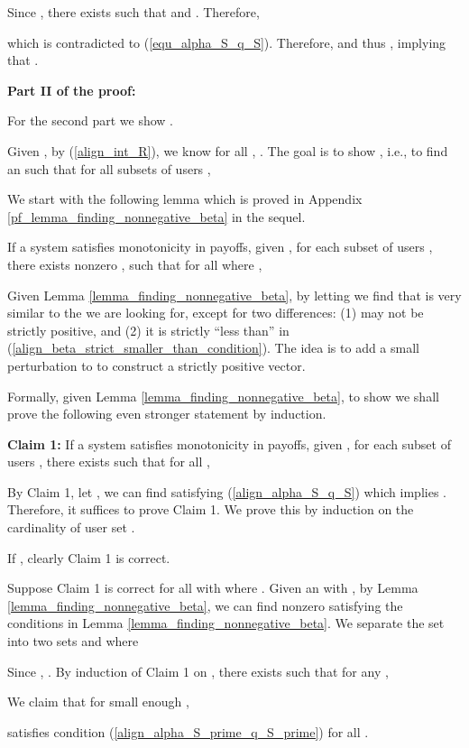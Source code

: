 \documentclass[prodmode,acmtompecs]{acmsmall}
\newcommand{\modelSatisfyPriorityImplication}{a system satisfies monotonicity in payoffs}
\begin{document}
Since , there exists  such that  and . Therefore, 

which is contradicted to (\ref{equ_alpha_S_q_S}). Therefore,  and thus , implying that . 

{\bf Part II of the proof: }

For the second part we show .

Given , by (\ref{align_int_R}), we know for all , . The goal is to show , i.e., to find an  such that for all subsets of users , 


We start with the following lemma which is proved in Appendix \ref{pf_lemma_finding_nonnegative_beta} in the sequel. 

\begin{lemma}
\label{lemma_finding_nonnegative_beta}
If \modelSatisfyPriorityImplication, given , for each subset of users , there exists nonzero , such that for all  where ,  

\end{lemma}

Given Lemma \ref{lemma_finding_nonnegative_beta}, by letting  we find  that is very similar to the  we are looking for, except for two differences: (1)  may not be strictly positive, and (2) it is strictly ``less than'' in (\ref{align_beta_strict_smaller_than_condition}). 
The idea is to add a small perturbation to  to construct a strictly positive vector. 

Formally, given Lemma \ref{lemma_finding_nonnegative_beta}, to show  we shall prove the following even stronger statement by induction. 

{\bf Claim 1:} If \modelSatisfyPriorityImplication, given , for each subset of users , there exists  such that for all , 


By Claim 1, let , we can find  satisfying (\ref{align_alpha_S_q_S}) which implies . Therefore, it suffices to prove Claim 1. We prove this by induction on the cardinality  of user set . 

If , clearly Claim 1 is correct. 

Suppose Claim 1 is correct for all  with  where . Given an  with , by Lemma \ref{lemma_finding_nonnegative_beta}, we can find nonzero  satisfying the conditions in Lemma \ref{lemma_finding_nonnegative_beta}. We separate the set  into two sets  and  where


Since , . By induction of Claim 1 on , there exists  such that for any , 


We claim that for small enough , 

satisfies condition (\ref{align_alpha_S_prime_q_S_prime}) for all . 
\end{document}
